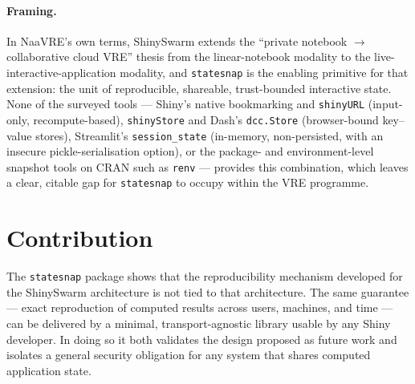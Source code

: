 \documentclass[11pt,a4paper]{article}
\begin{document}
\paragraph{Framing.}
In NaaVRE's own terms, ShinySwarm extends the ``private notebook $\rightarrow$
collaborative cloud VRE'' thesis from the linear-notebook modality to the
live-interactive-application modality, and \texttt{statesnap} is the enabling
primitive for that extension: the unit of reproducible, shareable, trust-bounded
interactive state. None of the surveyed tools --- Shiny's native bookmarking and
\texttt{shinyURL} (input-only, recompute-based), \texttt{shinyStore} and Dash's
\texttt{dcc.Store} (browser-bound key--value stores), Streamlit's
\texttt{session\_state} (in-memory, non-persisted, with an insecure
pickle-serialisation option), or the package- and environment-level snapshot
tools on CRAN such as \texttt{renv} --- provides this combination, which leaves a
clear, citable gap for \texttt{statesnap} to occupy within the VRE programme.

\section{Contribution}

The \texttt{statesnap} package shows that the reproducibility mechanism
developed for the ShinySwarm architecture is not tied to that architecture. The
same guarantee --- exact reproduction of computed results across users,
machines, and time --- can be delivered by a minimal, transport-agnostic library
usable by any Shiny developer. In doing so it both validates the design proposed
as future work and isolates a general security obligation for any system that
shares computed application state.
\end{document}
